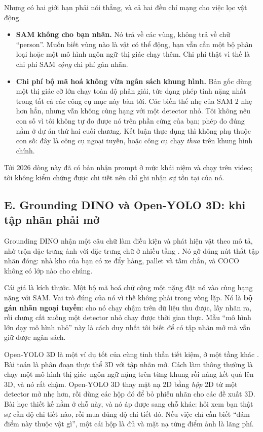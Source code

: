 \documentclass[../../deep_learning.tex]{subfiles}
\begin{document}
Nhưng có hai giới hạn phải nói thẳng, và cả hai đều chí mạng cho việc lọc vật động.

\begin{itemize}
\item \textbf{SAM không cho bạn nhãn.} Nó trả về các vùng, không trả về chữ ``person''. Muốn biết vùng nào là vật có thể động, bạn vẫn cần một bộ phân loại hoặc một mô hình ngôn ngữ--thị giác chạy thêm. Chi phí thật vì thế là chi phí SAM \emph{cộng} chi phí gán nhãn.
\item \textbf{Chi phí bộ mã hoá không vừa ngân sách khung hình.} Bản gốc dùng một  thị giác cỡ lớn chạy toàn độ phân giải, tức dạng phép tính nặng nhất trong tất cả các công cụ mục này bàn tới. Các biến thể nhẹ của SAM 2 nhẹ hơn hẳn, nhưng vẫn không cùng hạng với một detector nhỏ. Tôi không nêu con số vì tôi không tự đo được nó trên phần cứng của bạn; phép đo đúng nằm ở dự án thứ hai cuối chương. Kết luận thực dụng thì không phụ thuộc con số: đây là công cụ ngoại tuyến, hoặc công cụ chạy \emph{thưa} trên khung hình chính.
\end{itemize}

Tới 2026 dòng này đã có bản nhận prompt ở mức khái niệm và chạy trên video; tôi không kiểm chứng được chi tiết nên chỉ ghi nhận sự tồn tại của nó.

\subsection{E. Grounding DINO và Open-YOLO 3D: khi tập nhãn phải mở}
Grounding DINO nhận một câu chữ làm điều kiện và phát hiện vật theo mô tả, nhờ trộn đặc trưng ảnh với đặc trưng chữ ở nhiều tầng \cite{liu2024groundingdino}. Nó gỡ đúng nút thắt tập nhãn đóng: nhà kho của bạn có xe đẩy hàng, pallet và tấm chắn, và COCO không có lớp nào cho chúng.

Cái giá là kích thước. Một bộ mã hoá chữ cộng một  nặng đặt nó vào cùng hạng nặng với SAM. Vai trò đúng của nó vì thế không phải trong vòng lặp. Nó là \textbf{bộ gán nhãn ngoại tuyến}: cho nó chạy chậm trên dữ liệu thu được, lấy nhãn ra, rồi chưng cất xuống một detector nhỏ chạy được thời gian thực. Mẫu ``mô hình lớn dạy mô hình nhỏ'' này là cách duy nhất tôi biết để có tập nhãn mở mà vẫn giữ được ngân sách.

Open-YOLO 3D là một ví dụ tốt của cùng tinh thần tiết kiệm, ở một tầng khác \cite{boudjoghra2024openyolo3d}. Bài toán là phân đoạn thực thể 3D với tập nhãn mở. Cách làm thông thường là chạy một mô hình thị giác--ngôn ngữ nặng trên từng khung rồi nâng kết quả lên 3D, và nó rất chậm. Open-YOLO 3D thay mặt nạ 2D bằng \emph{hộp} 2D từ một detector mở nhẹ hơn, rồi dùng các hộp đó để bỏ phiếu nhãn cho các đề xuất 3D. Bài học thiết kế nằm ở chỗ này, và nó áp được sang chỗ khác: hỏi xem bạn thật sự cần độ chi tiết nào, rồi mua đúng độ chi tiết đó. Nếu việc chỉ cần biết ``đám điểm này thuộc vật gì'', một cái hộp là đủ và mặt nạ từng điểm ảnh là lãng phí.
\end{document}
